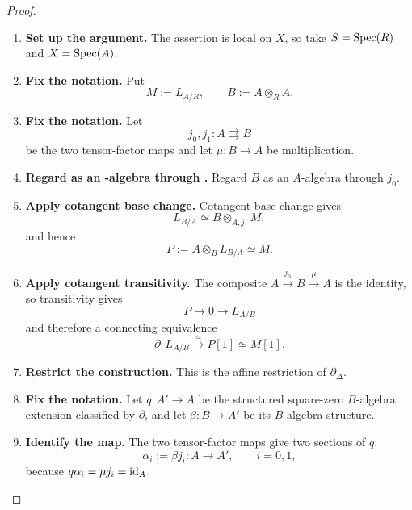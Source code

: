 \begin{proof}
\leavevmode
\begin{enumerate}[label=\textup{(\arabic*)}]
    \item \textbf{Set up the argument.}
    The assertion is local on \(X\), so take \(S=\operatorname{Spec}(R)\) and \(X=\operatorname{Spec}(A)\).

    \item \textbf{Fix the notation.}
    Put
    \[
            M:=L_{A/R},
            \qquad
            B:=A\otimes_RA.
        \]

    \item \textbf{Fix the notation.}
    Let
    \[
            j_0,j_1:A\rightrightarrows B
        \]
    be the two tensor-factor maps and let \(\mu:B\to A\) be multiplication.

    \item \textbf{Regard as an -algebra through .}
    Regard \(B\) as an \(A\)-algebra through \(j_0\).

    \item \textbf{Apply cotangent base change.}
    Cotangent base change gives
    \[
            L_{B/A}
            \simeq
            B\otimes_{A,j_1}M,
        \]
    and hence
    \[
            P:=A\otimes_BL_{B/A}
            \simeq
            M.
        \]

    \item \textbf{Apply cotangent transitivity.}
    The composite \(A\xrightarrow{j_0}B\xrightarrow{\mu}A\) is the identity, so transitivity gives
    \[
            P\longrightarrow0\longrightarrow L_{A/B}
        \]
    and therefore a connecting equivalence
    \[
            \partial:L_{A/B}
            \xrightarrow{\simeq}
            P[1]
            \simeq
            M[1].
        \]

    \item \textbf{Restrict the construction.}
    This is the affine restriction of \(\partial_\Delta\).

    \item \textbf{Fix the notation.}
    Let \(q:A'\to A\) be the structured square-zero \(B\)-algebra extension classified by
    \(\partial\), and let \(\beta:B\to A'\) be its \(B\)-algebra structure.

    \item \textbf{Identify the map.}
    The two tensor-factor maps give two sections of \(q\),
    \[
            \alpha_i:=\beta j_i:A\longrightarrow A',
            \qquad i=0,1,
        \]
    because \(q\alpha_i=\mu j_i=\operatorname{id}_A\).


\end{enumerate}
\end{proof}
